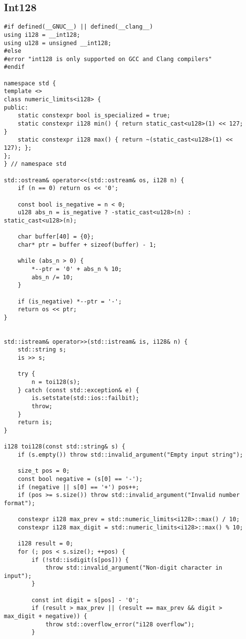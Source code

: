 \subsection{Int128}
\begin{lstlisting}
#if defined(__GNUC__) || defined(__clang__)
using i128 = __int128;
using u128 = unsigned __int128;
#else
#error "int128 is only supported on GCC and Clang compilers"
#endif

namespace std {
template <>
class numeric_limits<i128> {
public:
    static constexpr bool is_specialized = true;
    static constexpr i128 min() { return static_cast<u128>(1) << 127; }
    static constexpr i128 max() { return ~(static_cast<u128>(1) << 127); };
};
} // namespace std

std::ostream& operator<<(std::ostream& os, i128 n) {
    if (n == 0) return os << '0';
    
    const bool is_negative = n < 0;
    u128 abs_n = is_negative ? -static_cast<u128>(n) : static_cast<u128>(n);
    
    char buffer[40] = {0};
    char* ptr = buffer + sizeof(buffer) - 1;
    
    while (abs_n > 0) {
        *--ptr = '0' + abs_n % 10;
        abs_n /= 10;
    }
    
    if (is_negative) *--ptr = '-';
    return os << ptr;
}


std::istream& operator>>(std::istream& is, i128& n) {
    std::string s;
    is >> s;
    
    try {
        n = toi128(s);
    } catch (const std::exception& e) {
        is.setstate(std::ios::failbit);
        throw;
    }
    return is;
}

i128 toi128(const std::string& s) {
    if (s.empty()) throw std::invalid_argument("Empty input string");
    
    size_t pos = 0;
    const bool negative = (s[0] == '-');
    if (negative || s[0] == '+') pos++;
    if (pos >= s.size()) throw std::invalid_argument("Invalid number format");
    
    constexpr i128 max_prev = std::numeric_limits<i128>::max() / 10;
    constexpr i128 max_digit = std::numeric_limits<i128>::max() % 10;
    
    i128 result = 0;
    for (; pos < s.size(); ++pos) {
        if (!std::isdigit(s[pos])) {
            throw std::invalid_argument("Non-digit character in input");
        }
        
        const int digit = s[pos] - '0';
        if (result > max_prev || (result == max_prev && digit > max_digit + negative)) {
            throw std::overflow_error("i128 overflow");
        }
        

\end{lstlisting}
